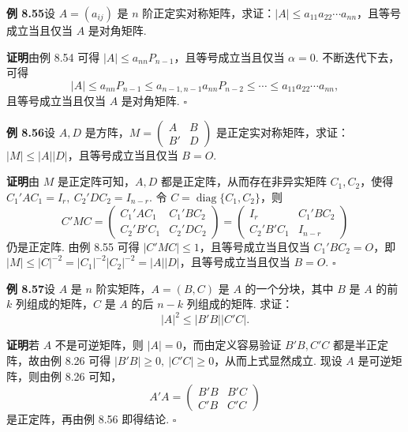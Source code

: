 \documentclass[UTF8, 12pt, fontset=fandol, oneside]{ctexart}
\begin{document}
\noindent\textbf{例 8.55}\quad 设 $A=(a_{ij})$ 是 $n$ 阶正定实对称矩阵，求证：$|A|\le a_{11}a_{22}\cdots a_{nn}$，且等号成立当且仅当 $A$ 是对角矩阵.

\noindent\textbf{证明}\quad 由例 8.54 可得 $|A|\le a_{nn}P_{n-1}$，且等号成立当且仅当 $\alpha=0$. 不断迭代下去，可得
\[
|A|\le a_{nn}P_{n-1}\le a_{n-1,n-1}a_{nn}P_{n-2}\le \cdots\le a_{11}a_{22}\cdots a_{nn},
\]
且等号成立当且仅当 $A$ 是对角矩阵. $\ensuremath{\square}$

\noindent\textbf{例 8.56}\quad 设 $A,D$ 是方阵，$M=\left(\begin{array}{cc}A&B\\ B'&D\end{array}\right)$ 是正定实对称矩阵，求证：$|M|\le |A||D|$，且等号成立当且仅当 $B=O$.

\noindent\textbf{证明}\quad 由 $M$ 是正定阵可知，$A,D$ 都是正定阵，从而存在非异实矩阵 $C_1,C_2$，使得 $C_1'AC_1=I_r,\ C_2'DC_2=I_{n-r}$. 令 $C=\operatorname{diag}\{C_1,C_2\}$，则
\[
C'MC=
\left(\begin{array}{cc}
C_1'AC_1 & C_1'BC_2\\
C_2'B'C_1 & C_2'DC_2
\end{array}\right)
=
\left(\begin{array}{cc}
I_r & C_1'BC_2\\
C_2'B'C_1 & I_{n-r}
\end{array}\right)
\]
仍是正定阵. 由例 8.55 可得 $|C'MC|\le 1$，且等号成立当且仅当 $C_1'BC_2=O$，即 $|M|\le |C|^{-2}=|C_1|^{-2}|C_2|^{-2}=|A||D|$，且等号成立当且仅当 $B=O$. $\ensuremath{\square}$

\noindent\textbf{例 8.57}\quad 设 $A$ 是 $n$ 阶实矩阵，$A=(B,C)$ 是 $A$ 的一个分块，其中 $B$ 是 $A$ 的前 $k$ 列组成的矩阵，$C$ 是 $A$ 的后 $n-k$ 列组成的矩阵. 求证：
\[
|A|^2\le |B'B||C'C|.
\]

\noindent\textbf{证明}\quad 若 $A$ 不是可逆矩阵，则 $|A|=0$，而由定义容易验证 $B'B,C'C$ 都是半正定阵，故由例 8.26 可得 $|B'B|\ge 0,\ |C'C|\ge 0$，从而上式显然成立. 现设 $A$ 是可逆矩阵，则由例 8.26 可知，
\[
A'A=\left(\begin{array}{cc}
B'B & B'C\\
C'B & C'C
\end{array}\right)
\]
是正定阵，再由例 8.56 即得结论. $\ensuremath{\square}$
\end{document}
